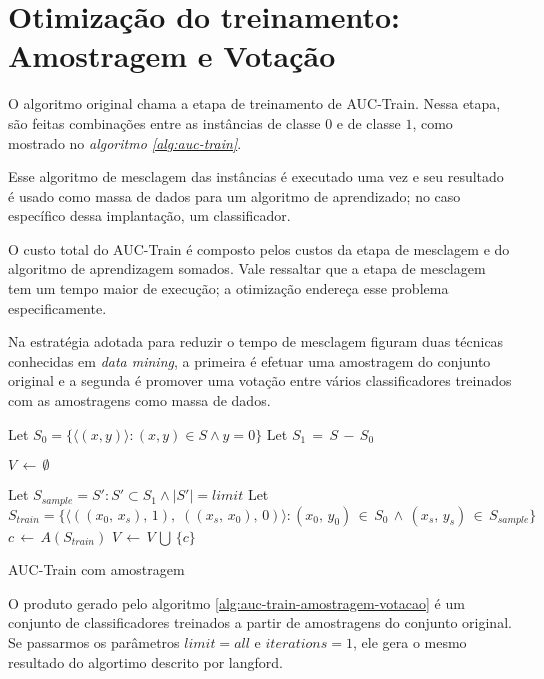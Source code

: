 \section{Otimização do treinamento: Amostragem e Votação}
O algoritmo original chama a etapa de treinamento de AUC-Train. Nessa etapa, são feitas combinações entre as instâncias de classe $0$ e de classe $1$, como mostrado no \emph{algoritmo \ref{alg:auc-train}}.

Esse algoritmo de mesclagem das instâncias é executado uma vez e seu resultado é usado como massa de dados para um algoritmo de aprendizado; no caso específico dessa implantação, um classificador.

O custo total do AUC-Train é composto pelos custos da etapa de mesclagem e do algoritmo de aprendizagem somados. Vale ressaltar que a etapa de mesclagem tem um tempo maior de execução; a otimização endereça esse problema especificamente.

Na estratégia adotada para reduzir o tempo de mesclagem figuram duas técnicas conhecidas em \emph{data mining}, a primeira é efetuar uma amostragem do conjunto original e a segunda é promover uma votação entre vários classificadores treinados com as amostragens como massa de dados.

\begin{algorithm}
\begin{algorithmic}

\STATE Let $S_0 = \{\langle (x, y) \rangle: (x, y) \in S \wedge y = 0\}$
\STATE Let $S_1\,=\,S\,-\,S_0$

\STATE $V\,\gets\,\emptyset$

\STATE Let $S_{sample} = S' : S' \subset S_1 \wedge |S'| = limit$
\STATE Let $S_{train} = \{\langle ((x_{0},\,x_{s}),\, 1),\; ((x_{s},\, x_{0}),\,0) \rangle:
       (x_{0},\,y_{0})\,\in\,S_{0}\,\wedge\,
       (x_{s},\,y_{s})\,\in\,S_{sample}\}$
\STATE $c\,\gets\,A(S_{train})$
\STATE $V\,\gets\,V\,\bigcup\,\{c\}$
\ENDFOR

\caption{AUC-Train com amostragem}
\label{alg:auc-train-amostragem-votacao}

\end{algorithmic}
\end{algorithm}

O produto gerado pelo algoritmo \ref{alg:auc-train-amostragem-votacao} é um conjunto de classificadores treinados a partir de amostragens do conjunto original. Se passarmos os parâmetros $limit=all$ e $iterations=1$, ele gera o mesmo resultado do algortimo descrito por {{langford}}.


